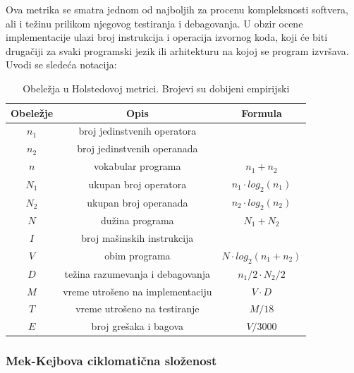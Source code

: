 \documentclass[a4paper]{article}
\begin{document}
Ova metrika se smatra jednom od najboljih za procenu kompleksnosti softvera, ali i težinu prilikom njegovog testiranja i debagovanja. U obzir ocene implementacije ulazi broj instrukcija i operacija izvornog koda, koji će biti drugačiji za svaki programski jezik ili arhitekturu na kojoj se program izvršava. Uvodi se sledeća notacija:
\begin{table}[h]
\centering
 \begin{tabular}{|c|c|c|}
  \hline
  Obeležje & Opis & Formula \\ [0ex]
  \hline $n_1$ & broj jedinstvenih operatora & \\ 
  \hline $n_2$ & broj jedinstvenih operanada & \\ 
  \hline $n$ & vokabular programa & $ n_1 + n_2 $ \\ 
  \hline $N_1$ & ukupan broj operatora & $ n_1 \cdot log_2(n_1) $ \\ 
  \hline $N_2$ & ukupan broj operanada & $ n_2 \cdot log_2(n_2) $ \\ 
  \hline $N$ & dužina programa & $ N_1 + N_2 $ \\
  \hline $I$ & broj mašinskih instrukcija & \\
  \hline $V$ & obim programa & $ N \cdot log_2(n_1+n_2) $ \\
  \hline $D$ & težina razumevanja i debagovanja & $ n_1/2 \cdot N_2 / 2  $ \\
  \hline $M$ & vreme utrošeno na implementaciju & $ V \cdot D $ \\
  \hline $T$ & vreme utrošeno na testiranje & $ M / 18 $ \\
  \hline $E$ & broj grešaka i bagova & $ V / 3000 $ \\
  \hline
 \end{tabular}
 \caption{Obeležja u Holstedovoj metrici. Brojevi su dobijeni empirijski \cite{ibm_halstead}}
 \label{tabela:1} 
\end{table}

\subsubsection{Mek-Kejbova ciklomatična složenost}
\label{subsec:mekkejb}
\end{document}
